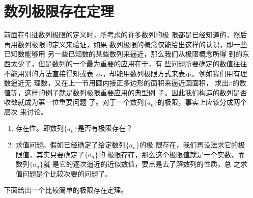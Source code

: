 \begin{example}
    
\end{example}

\begin{example}
    
\end{example}

\begin{example}
    
\end{example}

\begin{example}
    
\end{example}

\begin{example}
    
\end{example}

\begin{example}
    
\end{example}

\section{数列极限存在定理}
前面在引进数列极限的定义时，所考虑的许多数列的极
限都是已经知道的，然后再用数列极限的定义来验证，如果
数列极限的概念仅能给出这样的认识，即一些已知数能够用
另一些已知数的某些数列来逼近，那么我们从极限概念所得
到的东西太少了。但是数列的一个最为重要的应用在于，有
些问题所要确定的数值往往不能用别的方法直接得知或表
示，却能用数列极限方式来表示。例如我们用有理数逼近无
理数，又在上一节用圆内接正多边形的面积来逼近圆面积，
求出$\pi$的数值等，这样的例子就是数列极限重要应用的典型例
子。因此我们构造的数列是否收敛就成为第一位重要问题
了。对于一个数列$\{a_n\}$的极限，事实上应该分成两个层次
来讨论。

\begin{enumerate}
    \item 存在性。即数列$\{a_n\}$是否有极限存在？
    \item 求值问题。假如已经确定了给定数列$\{a_n\}$的极
限存在，我们再设法求它的极限值，其实只要确定了$\{a_n\}$的
极限存在，那么这个极限值就是一个实数，而数列$\{a_n\}$就
是它的逐次逼近的近似数值，要点是去了解数列的性质，总
之求值问题是个比较次要的问题了。 
\end{enumerate}

下面给出一个比较简单的极限存在定理。

